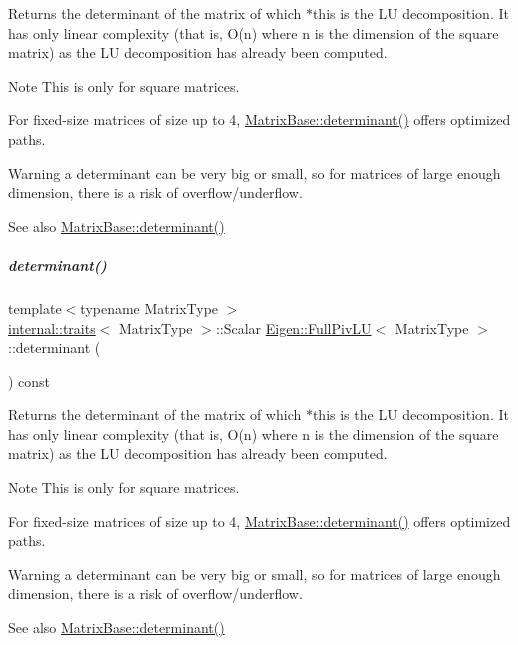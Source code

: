 \begin{DoxyReturn}{Returns}
the determinant of the matrix of which $\ast$this is the LU decomposition. It has only linear complexity (that is, O(n) where n is the dimension of the square matrix) as the LU decomposition has already been computed.
\end{DoxyReturn}
\begin{DoxyNote}{Note}
This is only for square matrices.

For fixed-\/size matrices of size up to 4, \hyperlink{group___core___module_a7ad8f77004bb956b603bb43fd2e3c061}{Matrix\+Base\+::determinant()} offers optimized paths.
\end{DoxyNote}
\begin{DoxyWarning}{Warning}
a determinant can be very big or small, so for matrices of large enough dimension, there is a risk of overflow/underflow.
\end{DoxyWarning}
\begin{DoxySeeAlso}{See also}
\hyperlink{group___core___module_a7ad8f77004bb956b603bb43fd2e3c061}{Matrix\+Base\+::determinant()} 
\end{DoxySeeAlso}
\mbox{\label{group___l_u___module_a71654e5c60a26407ecccfaa5b34bb0aa}} 
\subparagraph{\texorpdfstring{determinant()}{determinant()}\hspace{0.1cm}{\footnotesize\ttfamily [2/2]}}
{\footnotesize\ttfamily template$<$typename Matrix\+Type $>$ \\
\hyperlink{struct_eigen_1_1internal_1_1traits}{internal\+::traits}$<$ Matrix\+Type $>$\+::Scalar \hyperlink{group___l_u___module_class_eigen_1_1_full_piv_l_u}{Eigen\+::\+Full\+Piv\+LU}$<$ Matrix\+Type $>$\+::determinant (\begin{DoxyParamCaption}{ }\end{DoxyParamCaption}) const}

\begin{DoxyReturn}{Returns}
the determinant of the matrix of which $\ast$this is the LU decomposition. It has only linear complexity (that is, O(n) where n is the dimension of the square matrix) as the LU decomposition has already been computed.
\end{DoxyReturn}
\begin{DoxyNote}{Note}
This is only for square matrices.

For fixed-\/size matrices of size up to 4, \hyperlink{group___core___module_a7ad8f77004bb956b603bb43fd2e3c061}{Matrix\+Base\+::determinant()} offers optimized paths.
\end{DoxyNote}
\begin{DoxyWarning}{Warning}
a determinant can be very big or small, so for matrices of large enough dimension, there is a risk of overflow/underflow.
\end{DoxyWarning}
\begin{DoxySeeAlso}{See also}
\hyperlink{group___core___module_a7ad8f77004bb956b603bb43fd2e3c061}{Matrix\+Base\+::determinant()} 
\end{DoxySeeAlso}


